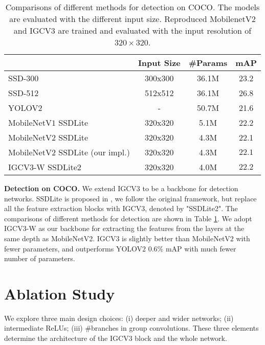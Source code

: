 \documentclass{bmvc2k}
\begin{document}
	\begin{table}[ht]
		\centering
		\begin{tabular}{|l||c|c|c|}
			\hline
			& Input Size & \#Params& mAP\\
			\hline\hline
			SSD-300 \cite{liu2016ssd}                          &300x300&36.1M&23.2\\
			SSD-512 \cite{liu2016ssd}                          &512x512&36.1M&26.8\\
			YOLOV$2$ \cite{redmon2017yolo9000}                           &-&50.7M&21.6\\
			MobileNetV$1$ SSDLite \cite{howard2017mobilenets}                 &320x320&5.1M&22.2\\
			MobileNetV$2$ SSDLite \cite{sandler2018inverted}                 &320x320&4.3M&22.1\\
			\hline\hline
			MobileNetV$2$ SSDLite (our impl.)&320x320& 4.3M & $22.1$ \\
			IGCV$3$-W SSDLite2       &320x320& 4.0M & $22.2$ \\
			\hline
		\end{tabular}
		\caption{Comparisons of different methods for detection on COCO. The models are evaluated with the different input size. Reproduced MobilenetV2 and IGCV3 are trained and evaluated with the input resolution of $320\times320$.}
		\label{det:coco}
	\end{table}
	\noindent\textbf{Detection on COCO.} We extend IGCV$3$ to be a backbone for detection networks. SSDLite is proposed in \cite{sandler2018inverted}, we follow the original framework, but replace all the feature extraction blocks with IGCV3, denoted by "SSDLite2".
	The comparisons of different methods for detection are shown in Table \ref{det:coco}. We adopt IGCV$3$-W as our backbone for extracting the features from the layers at the same depth as MobileNetV2.
	IGCV3 is slightly better than MobileNetV$2$ with fewer parameters, and outperforms YOLOV$2$ 0.6\% mAP with much fewer number of parameters.

	\section{Ablation Study}
	\label{sec:ab-study}
	We explore three main design choices: (i) deeper and wider networks;
	(ii) intermediate ReLUs; (iii) \#branches in group convolutions. These three elements determine the architecture of the IGCV3 block and the whole network.
\end{document}
